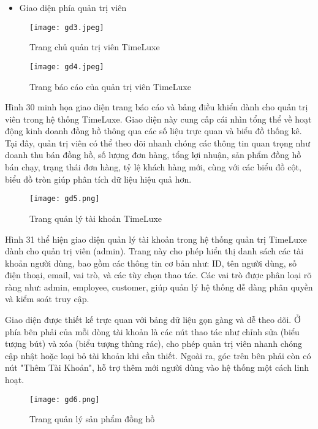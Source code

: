 \begin{itemize}
    \item Giao diện phía quản trị viên
\end{itemize}

\begin{figure}[H]
  \centering
  \texttt{[image: gd3.jpeg]}
  \caption{Trang chủ quản trị viên TimeLuxe}
  \label{fig:admin-dashboard}
\end{figure}

\begin{figure}[H]
  \centering
  \texttt{[image: gd4.jpeg]}
  \caption{Trang báo cáo của quản trị viên TimeLuxe}
  \label{fig:admin-report}
\end{figure}

Hình 30 minh họa giao diện trang báo cáo và bảng điều khiển dành cho quản trị viên trong hệ thống TimeLuxe. Giao diện này cung cấp cái nhìn tổng thể về hoạt động kinh doanh đồng hồ thông qua các số liệu trực quan và biểu đồ thống kê. Tại đây, quản trị viên có thể theo dõi nhanh chóng các thông tin quan trọng như doanh thu bán đồng hồ, số lượng đơn hàng, tổng lợi nhuận, sản phẩm đồng hồ bán chạy, trạng thái đơn hàng, tỷ lệ khách hàng mới, cùng với các biểu đồ cột, biểu đồ tròn giúp phân tích dữ liệu hiệu quả hơn.

\begin{figure}[H]
  \centering
  \texttt{[image: gd5.png]}
  \caption{Trang quản lý tài khoản TimeLuxe}
  \label{fig:admin-accounts}
\end{figure}

Hình 31 thể hiện giao diện quản lý tài khoản trong hệ thống quản trị TimeLuxe dành cho quản trị viên (admin). Trang này cho phép hiển thị danh sách các tài khoản người dùng, bao gồm các thông tin cơ bản như: ID, tên người dùng, số điện thoại, email, vai trò, và các tùy chọn thao tác. Các vai trò được phân loại rõ ràng như: admin, employee, customer, giúp quản lý hệ thống dễ dàng phân quyền và kiểm soát truy cập.

Giao diện được thiết kế trực quan với bảng dữ liệu gọn gàng và dễ theo dõi. Ở phía bên phải của mỗi dòng tài khoản là các nút thao tác như chỉnh sửa (biểu tượng bút) và xóa (biểu tượng thùng rác), cho phép quản trị viên nhanh chóng cập nhật hoặc loại bỏ tài khoản khi cần thiết. Ngoài ra, góc trên bên phải còn có nút "Thêm Tài Khoản", hỗ trợ thêm mới người dùng vào hệ thống một cách linh hoạt.

\begin{figure}[H]
  \centering
  \texttt{[image: gd6.png]}
  \caption{Trang quản lý sản phẩm đồng hồ}
  \label{fig:admin-products}
\end{figure}

